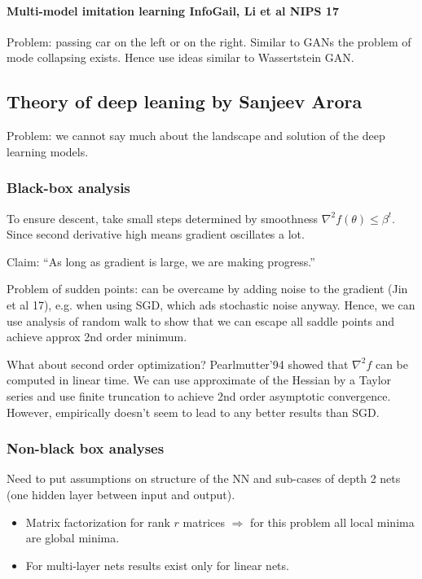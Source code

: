 \documentclass[11pt,oneside,a4paper]{scrartcl}
\begin{document}
\paragraph{Multi-model imitation learning InfoGail, Li et al NIPS 17}

Problem: passing car on the left or on the right. Similar to GANs the
problem of mode collapsing exists. Hence use ideas similar to
Wassertstein GAN.


\subsection{Theory of deep leaning by Sanjeev Arora}

Problem: we cannot say much about the landscape and solution of the
deep learning models.

\subsubsection{Black-box analysis}

To ensure descent, take small steps determined by smoothness
$\nabla^2f(\theta) \leq \beta^t$. Since second derivative high means
gradient oscillates a lot.

Claim: ``As long as gradient is large, we are making progress.'' 

Problem of sudden points: can be overcame by adding noise to the
gradient (Jin et al 17), e.g. when using SGD, which ads stochastic
noise anyway. Hence, we can use analysis of random walk to show that
we can escape all saddle points and achieve approx 2nd order minimum.

What about second order optimization? Pearlmutter'94 showed that
$\nabla^2f$ can be computed in linear time. We can use approximate of
the Hessian by a Taylor series and use finite truncation to achieve
2nd order asymptotic convergence. However, empirically doesn't seem to
lead to any better results than SGD.

\subsubsection{Non-black box analyses}
\label{sec:non-black-box}

Need to put assumptions on structure of the NN and sub-cases of depth 2
nets (one hidden layer between input and output).

\begin{itemize}
\item Matrix factorization for rank $r$ matrices $\Rightarrow$
  for this problem all local minima are global minima.
  
\item For multi-layer nets results exist only for linear nets. 
\end{itemize}
\end{document}
